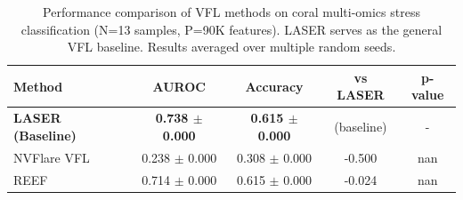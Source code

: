 
\begin{table}[h]
\centering
\caption{Performance comparison of VFL methods on coral multi-omics stress classification (N=13 samples, P=90K features). LASER serves as the general VFL baseline. Results averaged over multiple random seeds.}
\label{tab:vfl_comparison}
\begin{tabular}{lcccc}
\toprule
\textbf{Method} & \textbf{AUROC} & \textbf{Accuracy} & \textbf{vs LASER} & \textbf{p-value} \\
\midrule
\textbf{LASER (Baseline)} & \textbf{0.738 $\pm$ 0.000} & \textbf{0.615 $\pm$ 0.000} & (baseline) & - \\
NVFlare VFL & 0.238 $\pm$ 0.000 & 0.308 $\pm$ 0.000 & -0.500 & nan \\
REEF & 0.714 $\pm$ 0.000 & 0.615 $\pm$ 0.000 & -0.024 & nan \\

\bottomrule
\end{tabular}
\end{table}
